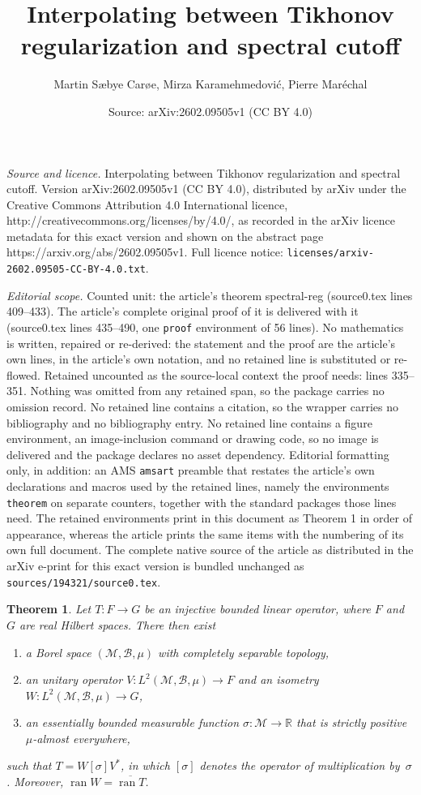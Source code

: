 \documentclass[10pt,a4paper]{amsart}
\title{Interpolating between Tikhonov regularization and spectral cutoff}
\author{Martin Sæbye Carøe, Mirza Karamehmedovi\'c, Pierre Maréchal}
\date{Source: arXiv:2602.09505v1 (CC BY 4.0)}
\newtheorem{theorem}{Theorem}
\def\B{\mathscr{B}}
\def\M{\mathscr{M}}
\def\Re{\mathds{R}}
\def\ran#1{\mathop{\mathrm{ran}}#1}
\begin{document}
\maketitle

\noindent\emph{Source and licence.} Interpolating between Tikhonov regularization and spectral cutoff. Version arXiv:2602.09505v1 (CC BY 4.0), distributed by arXiv under the Creative Commons Attribution 4.0 International licence, http://creativecommons.org/licenses/by/4.0/, as recorded in the arXiv licence metadata for this exact version and shown on the abstract page https://arxiv.org/abs/2602.09505v1. Full licence notice: \texttt{licenses/arxiv-2602.09505-CC-BY-4.0.txt}.\par\smallskip

\noindent\textit{Editorial scope.} Counted unit: the article's theorem spectral-reg (source0.tex lines 409--433). The article's complete original proof of it is delivered with it (source0.tex lines 435--490, one \texttt{proof} environment of 56 lines). No mathematics is written, repaired or re-derived: the statement and the proof are the article's own lines, in the article's own notation, and no retained line is substituted or re-flowed.  Retained uncounted as the source-local context the proof needs: lines 335--351.  Nothing was omitted from any retained span, so the package carries no omission record.  No retained line contains a citation, so the wrapper carries no bibliography and no bibliography entry.  No retained line contains a figure environment, an image-inclusion command or drawing code, so no image is delivered and the package declares no asset dependency.  Editorial formatting only, in addition: an AMS \texttt{amsart} preamble that restates the article's own declarations and macros used by the retained lines, namely the environments \texttt{theorem} on separate counters, together with the standard packages those lines need.  The retained environments print in this document as Theorem 1 in order of appearance, whereas the article prints the same items with the numbering of its own full document.  The complete native source of the article as distributed in the arXiv e-print for this exact version is bundled unchanged as \texttt{sources/194321/source0.tex}.
\begin{theorem}\sf
\label{sve}
Let $T\colon F\to G$ be an injective bounded linear operator, where $F$ and $G$
are real Hilbert spaces. There then exist
\begin{enumerate}
\item
a Borel space $(\M,\B,\mu)$ with completely separable topology,
\item
an unitary operator $V\colon L^2(\M,\B,\mu)\to F$ and
an isometry $W\colon L^2(\M,\B,\mu)\to G$,
\item
an essentially bounded measurable function $\sigma\colon\M\to\Re$
that is strictly positive $\mu$-almost everywhere,
\end{enumerate}
such that $T=W[\sigma]V^*$, in which $[\sigma]$ denotes the operator of
multiplication by~$\sigma$. Moreover, $\ran{W}=\overline{\ran{T}}$. 
\end{theorem}
\end{document}
